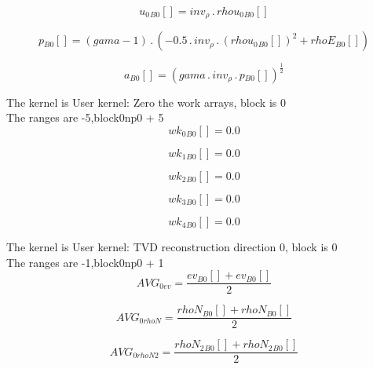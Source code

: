 \documentclass{article}
\begin{document}
\begin{dmath}{u_{0}{_{B0}}}[{}] = inv_{\rho} \,.\, {rhou_{0}{_{B0}}}[{}]\end{dmath}

\begin{dmath}{p{_{B0}}}[{}] = \left(gama - 1\right) \,.\, \left(- 0.5 \,.\, inv_{\rho} \,.\, \left({rhou_{0}{_{B0}}}[{}] \right)^{2} + {rhoE{_{B0}}}[{}]\right)\end{dmath}

\begin{dmath}{a{_{B0}}}[{}] = \left(gama \,.\, inv_{\rho} \,.\, {p{_{B0}}}[{}] \right)^{\frac{1}{2}}\end{dmath}

\noindent The kernel is User kernel: Zero the work arrays, block is 0\\\noindent The ranges are -5,block0np0 + 5\\\begin{dmath}{wk_{0}{_{B0}}}[{}] = 0.0\end{dmath}

\begin{dmath}{wk_{1}{_{B0}}}[{}] = 0.0\end{dmath}

\begin{dmath}{wk_{2}{_{B0}}}[{}] = 0.0\end{dmath}

\begin{dmath}{wk_{3}{_{B0}}}[{}] = 0.0\end{dmath}

\begin{dmath}{wk_{4}{_{B0}}}[{}] = 0.0\end{dmath}

\noindent The kernel is User kernel: TVD reconstruction direction 0, block is 0\\\noindent The ranges are -1,block0np0 + 1\\\begin{dmath}AVG_{0 ev} = \frac{{ev{_{B0}}}[{}] + {ev{_{B0}}}[{}]}{2}\end{dmath}

\begin{dmath}AVG_{0 rhoN} = \frac{{rhoN{_{B0}}}[{}] + {rhoN{_{B0}}}[{}]}{2}\end{dmath}

\begin{dmath}AVG_{0 rhoN2} = \frac{{rhoN_{2}{_{B0}}}[{}] + {rhoN_{2}{_{B0}}}[{}]}{2}\end{dmath}
\end{document}
